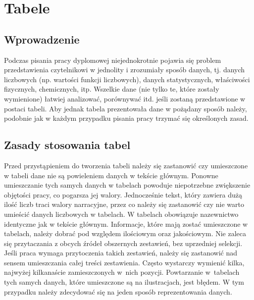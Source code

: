 \chapter{Tabele}
\section{Wprowadzenie}
Podczas pisania pracy dyplomowej niejednokrotnie pojawia się problem przedstawienia czytelnikowi w jednolity i zrozumiały sposób danych, tj. danych liczbowych (np. wartości funkcji liczbowych), danych statystycznych,
właściwości fizycznych, chemicznych, itp. Wszelkie dane (nie tylko te, które zostały wymienione) łatwiej analizować, porównywać itd. jeśli zostaną przedstawione w postaci tabeli. Aby jednak tabela prezentowała dane w pożądany sposób należy, podobnie \pauza jak w każdym przypadku pisania pracy \pauza trzymać się określonych zasad.
\section{Zasady stosowania tabel}
Przed przystąpieniem do tworzenia tabeli należy się zastanowić czy umieszczone w tabeli dane nie są powieleniem danych w tekście głównym. Ponowne umieszczanie tych samych danych w tabelach powoduje niepotrzebne zwiększenie objętości pracy, co pogarsza jej walory. Jednocześnie tekst, który zawiera dużą ilość liczb traci walory narracyjne, przez co należy się zastanowić czy nie warto umieścić danych liczbowych w tabelach. W tabelach obowiązuje nazewnictwo identyczne jak w tekście głównym. Informacje, które mają zostać umieszczone w tabelach, należy dobrać pod względem ilościowym oraz jakościowym. Nie zaleca się przytaczania z obcych źródeł obszernych zestawień, bez uprzedniej selekcji. Jeśli praca wymaga przytoczenia takich zestawień, należy się zastanowić nad sensem umieszczania całej treści zestawienia. Często wystarczy wymienić kilka, najwyżej kilkanaście zamieszczonych w~nich pozycji. Powtarzanie w~tabelach tych samych danych, które umieszczone są na ilustracjach, jest błędem. W tym przypadku należy zdecydować się na jeden sposób reprezentowania danych.


